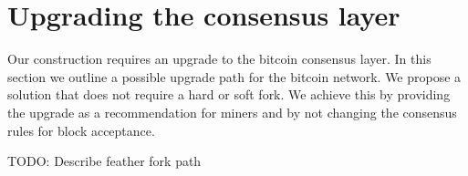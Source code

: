 \section{Upgrading the consensus layer}

Our construction requires an upgrade to the bitcoin consensus layer. In this
section we outline a possible upgrade path for the bitcoin network. We propose
a solution that does not require a hard or soft fork. We achieve this by
providing the upgrade as a recommendation for miners and by not changing the
consensus rules for block acceptance.

TODO: Describe feather fork path
